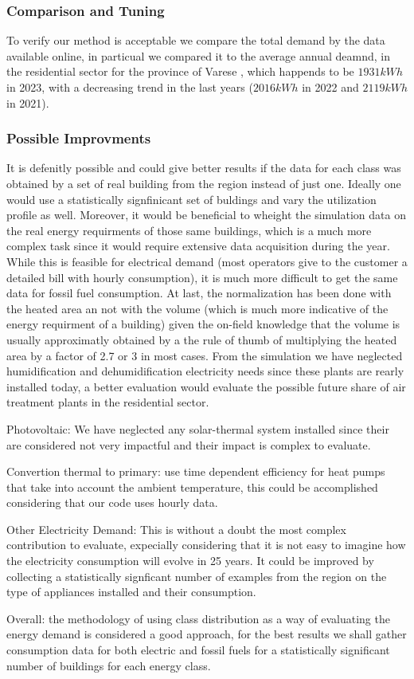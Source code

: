 
\subsubsection{Comparison and Tuning}
To verify our method is acceptable we compare the total demand by the data available online, in particual we compared it to the average annual deamnd,
in the residential sector for the province of Varese \cite{portaleconsumi_energia_domestica}, which happends to be $1931 kWh$ in 2023,
with a decreasing trend in the last years ($2016kWh$ in 2022 and $2119kWh$ in 2021). 


\subsubsection{Possible Improvments}
It is defenitly possible and could give better results if the data for each class was obtained by a set of real building from the region instead of just one.
Ideally one would use a statistically signfinicant set of buldings and vary the utilization profile as well.
Moreover, it would be beneficial to wheight the simulation data on the real energy requirments of those same buildings,
which is a much more complex task since it would require extensive data acquisition during the year. 
While this is feasible for electrical demand (most operators give to the customer a detailed bill with hourly consumption),
it is much more difficult to get the same data for fossil fuel consumption.
At last, the normalization has been done with the heated area an not with the volume (which is much more indicative of the energy requirment of a building) 
given the on-field knowledge that the volume is usually approximatly obtained by a the rule of thumb of multiplying the heated area by a factor of 2.7 or 3 in most cases.
From the simulation we have neglected humidification and dehumidification electricity needs since these plants are rearly installed today,
a better evaluation would evaluate the possible future share of air treatment plants in the residential sector.

Photovoltaic: We have neglected any solar-thermal system installed since their are considered not very impactful and their impact is complex to evaluate.

Convertion thermal to primary: use time dependent efficiency for heat pumps that take into account the ambient temperature,
this could be accomplished considering that our code uses hourly data.

Other Electricity Demand: This is without a doubt the most complex contribution to evaluate,
expecially considering that it is not easy to imagine how the electricity consumption will evolve in 25 years.
It could be improved by collecting a statistically signficant number of examples from the region on the type of appliances installed and their consumption.

Overall: the methodology of using class distribution as a way of evaluating the energy demand is considered a good approach,
for the best results we shall gather consumption data for both electric and fossil fuels for a statistically significant number of buildings for each energy class.